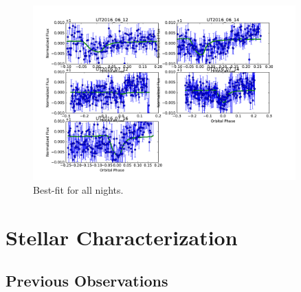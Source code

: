 \documentclass[preprint]{aastex61}
\begin{document}
\begin{figure}
\begin{centering}
\includegraphics[width=0.9\textwidth]{images/tser_fits/best_fit_all.pdf}
\caption{Best-fit for all nights.}\label{fig:fitAll}
\end{centering}
\end{figure}

\clearpage

\section{Stellar Characterization}
\subsection{Previous Observations}
\end{document}
